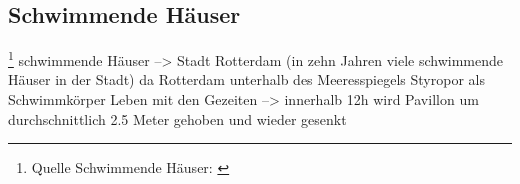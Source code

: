 \subsection{Schwimmende Häuser} \footnote{Quelle Schwimmende Häuser: \cite{schwimmende_haeuser} \cite{schwimmende_haeuser2}}
schwimmende Häuser
--> Stadt Rotterdam	(in zehn Jahren viele schwimmende Häuser in der Stadt)
da Rotterdam unterhalb des Meeresspiegels
\newline\newline
Styropor als Schwimmkörper
\newline\newline
Leben mit den Gezeiten
--> innerhalb 12h wird Pavillon um durchschnittlich 2.5 Meter gehoben und wieder gesenkt
\newline\newline
